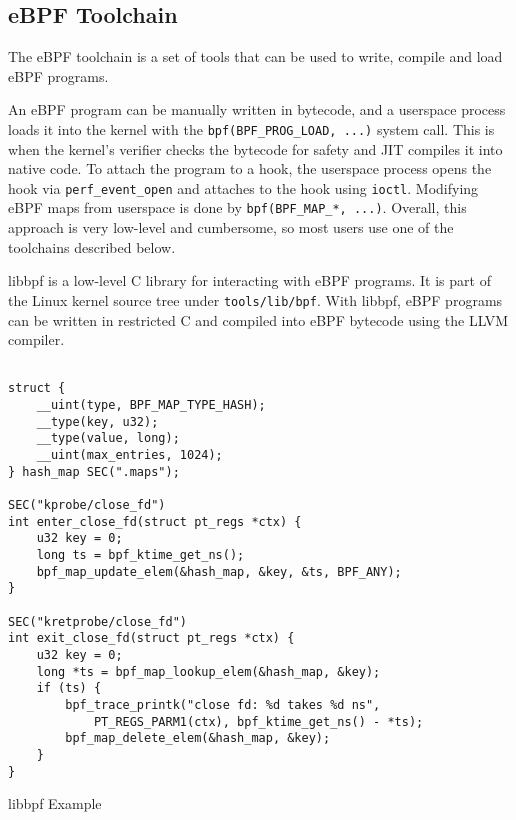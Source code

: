 
\subsection{eBPF Toolchain}
The eBPF toolchain is a set of tools that can be used to write, compile and load eBPF programs.

An eBPF program can be manually written in bytecode, and a userspace process loads it into the kernel with the \texttt{bpf(BPF\_PROG\_LOAD, ...)} system call. This is when the kernel's verifier checks the bytecode for safety and JIT compiles it into native code.
To attach the program to a hook, the userspace process opens the hook via \texttt{perf\_event\_open} and attaches to the hook using \texttt{ioctl}.
Modifying eBPF maps from userspace is done by \texttt{bpf(BPF\_MAP\_*, ...)}.
Overall, this approach is very low-level and cumbersome, so most users use one of the toolchains described below.

libbpf is a low-level C library for interacting with eBPF programs.
It is part of the Linux kernel source tree under \texttt{tools/lib/bpf}.
With libbpf, eBPF programs can be written in restricted C and compiled into eBPF bytecode using the LLVM compiler. \todo{}




\begin{listing}[t]
\begin{verbatim}

struct {
    __uint(type, BPF_MAP_TYPE_HASH);
    __type(key, u32);
    __type(value, long);
    __uint(max_entries, 1024);
} hash_map SEC(".maps");

SEC("kprobe/close_fd") 
int enter_close_fd(struct pt_regs *ctx) {
    u32 key = 0;
    long ts = bpf_ktime_get_ns();
    bpf_map_update_elem(&hash_map, &key, &ts, BPF_ANY);
}

SEC("kretprobe/close_fd") 
int exit_close_fd(struct pt_regs *ctx) {
    u32 key = 0;
    long *ts = bpf_map_lookup_elem(&hash_map, &key);
    if (ts) {
        bpf_trace_printk("close fd: %d takes %d ns", 
            PT_REGS_PARM1(ctx), bpf_ktime_get_ns() - *ts);
        bpf_map_delete_elem(&hash_map, &key);
    }
}
\end{verbatim}
\caption{libbpf Example}
\label{fig:libbpf_example}
\end{listing}

